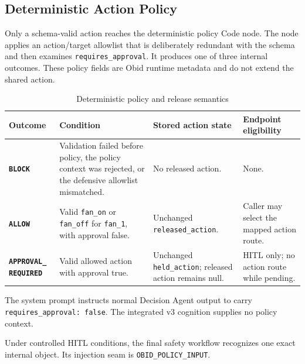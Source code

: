 \subsection{Deterministic Action Policy}\label{subsec:impl-policy}

Only a schema-valid action reaches the deterministic policy Code node. The
node applies an action/target allowlist that is deliberately redundant with
the schema and then examines \texttt{requires\_approval}. It produces one of
three internal outcomes. These policy fields are Obid runtime metadata and do
not extend the shared action.

\begin{table}[H]
\centering
\caption{Deterministic policy and release semantics}
\label{tab:impl-policy}

\begingroup
\footnotesize
\setlength{\tabcolsep}{3.5pt}
\renewcommand{\arraystretch}{1.16}

\begin{tabularx}{\textwidth}{
  @{}
  L{0.20\textwidth}
  L{0.35\textwidth}
  L{0.23\textwidth}
  Y
  @{}
}
\toprule
\textbf{Outcome}
&
\textbf{Condition}
&
\textbf{Stored action state}
&
\textbf{Endpoint eligibility}
\\
\midrule

\textbf{\texttt{BLOCK}}
&
Validation failed before policy, the policy context was rejected, or
the defensive allowlist mismatched.
&
No released action.
&
None.
\\
\addlinespace[2pt]

\textbf{\texttt{ALLOW}}
&
Valid \texttt{fan\_on} or \texttt{fan\_off} for \texttt{fan\_1}, with
approval false.
&
Unchanged \texttt{released\_action}.
&
Caller may select the mapped action route.
\\
\addlinespace[2pt]

\textbf{\texttt{APPROVAL\_}}\newline
\textbf{\texttt{REQUIRED}}
&
Valid allowed action with approval true.
&
Unchanged \texttt{held\_action}; released action remains null.
&
HITL only; no action route while pending.
\\

\bottomrule
\end{tabularx}
\endgroup
\end{table}

The system prompt instructs normal Decision Agent output to carry
\texttt{requires\_approval: false}. The integrated v3 cognition supplies no
policy context.

Under controlled HITL conditions, the final safety workflow recognizes one
exact internal object. Its injection seam is
{\small\texttt{OBID\_POLICY\_INPUT}}.

